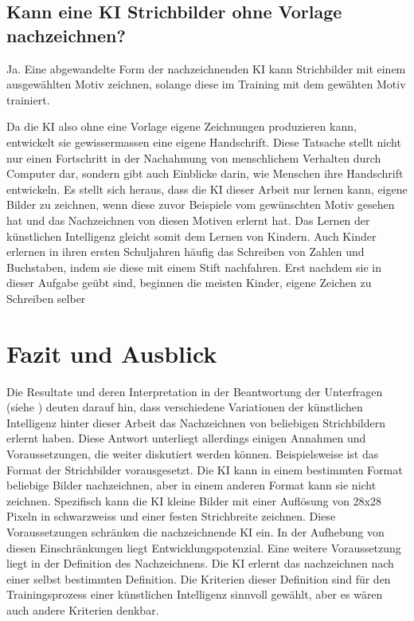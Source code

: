 \subsection{Kann eine KI Strichbilder ohne Vorlage
nachzeichnen?}\label{subsub:d_frage_unter_6} Ja. Eine abgewandelte Form der
nachzeichnenden KI kann Strichbilder mit einem ausgewählten Motiv zeichnen,
solange diese im Training mit dem gewähten Motiv trainiert.

Da die KI also ohne eine Vorlage eigene Zeichnungen produzieren kann, entwickelt
sie gewissermassen eine eigene Handschrift. Diese Tatsache stellt nicht nur
einen Fortschritt in der Nachahmung von menschlichem Verhalten durch Computer
dar, sondern gibt auch Einblicke darin, wie Menschen ihre Handschrift
entwickeln. Es stellt sich heraus, dass die KI dieser Arbeit nur lernen kann,
eigene Bilder zu zeichnen, wenn diese zuvor Beispiele vom gewünschten Motiv
gesehen hat und das Nachzeichnen von diesen Motiven erlernt hat. Das Lernen der
künstlichen Intelligenz gleicht somit dem Lernen von Kindern. Auch Kinder
erlernen in ihren ersten Schuljahren häufig das Schreiben von Zahlen und
Buchstaben, indem sie diese mit einem Stift nachfahren. Erst nachdem sie in
dieser Aufgabe geübt sind, beginnen die meisten Kinder, eigene Zeichen zu
Schreiben selber 


\section{Fazit und Ausblick}\label{chap:d_faz-aus} Die Resultate und deren
Interpretation in der Beantwortung der Unterfragen (siehe
) deuten darauf hin, dass verschiedene Variationen der
künstlichen Intelligenz hinter dieser Arbeit das Nachzeichnen von beliebigen
Strichbildern erlernt haben. Diese Antwort unterliegt allerdings einigen
Annahmen und Voraussetzungen, die weiter diskutiert werden können.
Beispielsweise ist das Format der Strichbilder vorausgesetzt. Die KI kann in
einem bestimmten Format beliebige Bilder nachzeichnen, aber in einem anderen
Format kann sie nicht zeichnen. Spezifisch kann die KI kleine Bilder mit einer
Auflösung von 28x28 Pixeln in schwarzweiss und einer festen Strichbreite
zeichnen. Diese Voraussetzungen schränken die nachzeichnende KI ein. In der
Aufhebung von diesen Einschränkungen liegt Entwicklungspotenzial. Eine weitere
Voraussetzung liegt in der Definition des Nachzeichnens. Die KI erlernt das
nachzeichnen nach einer selbst bestimmten Definition. Die Kriterien dieser
Definition sind für den Trainingsprozess einer künstlichen Intelligenz sinnvoll
gewählt, aber es wären auch andere Kriterien denkbar.

